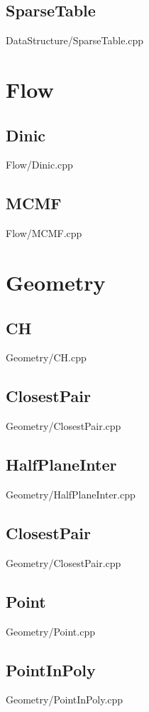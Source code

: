     \subsection{SparseTable}
         {DataStructure/SparseTable.cpp}

\section{Flow}
    \subsection{Dinic}
         {Flow/Dinic.cpp}
    \subsection{MCMF}
         {Flow/MCMF.cpp}

\section{Geometry}
    \subsection{CH}
         {Geometry/CH.cpp}
    \subsection{ClosestPair}
         {Geometry/ClosestPair.cpp}
    \subsection{HalfPlaneInter}
         {Geometry/HalfPlaneInter.cpp}
    \subsection{ClosestPair}
         {Geometry/ClosestPair.cpp}
    \subsection{Point}
         {Geometry/Point.cpp}
    \subsection{PointInPoly}
         {Geometry/PointInPoly.cpp}
